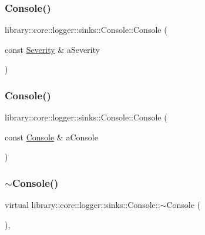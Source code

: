 \subsubsection{\texorpdfstring{Console()}{Console()}\hspace{0.1cm}{\footnotesize\ttfamily [1/2]}}
{\footnotesize\ttfamily library\+::core\+::logger\+::sinks\+::\+Console\+::\+Console (\begin{DoxyParamCaption}\item[{const \hyperlink{namespacelibrary_1_1core_1_1logger_a35f71353edf64f68f7fe3874b01abaa8}{Severity} \&}]{a\+Severity }\end{DoxyParamCaption})}

\mbox{\label{classlibrary_1_1core_1_1logger_1_1sinks_1_1_console_a6d7feabeb113b6448d0b83d114175328}} 
\subsubsection{\texorpdfstring{Console()}{Console()}\hspace{0.1cm}{\footnotesize\ttfamily [2/2]}}
{\footnotesize\ttfamily library\+::core\+::logger\+::sinks\+::\+Console\+::\+Console (\begin{DoxyParamCaption}\item[{const \hyperlink{classlibrary_1_1core_1_1logger_1_1sinks_1_1_console}{Console} \&}]{a\+Console }\end{DoxyParamCaption})}

\mbox{\label{classlibrary_1_1core_1_1logger_1_1sinks_1_1_console_adefb4276dd98ae3d6183b4c2351f88b6}} 
\subsubsection{\texorpdfstring{$\sim$\+Console()}{~Console()}}
{\footnotesize\ttfamily virtual library\+::core\+::logger\+::sinks\+::\+Console\+::$\sim$\+Console (\begin{DoxyParamCaption}{ }\end{DoxyParamCaption})\hspace{0.3cm}{\ttfamily [override]}, {\ttfamily [virtual]}}



